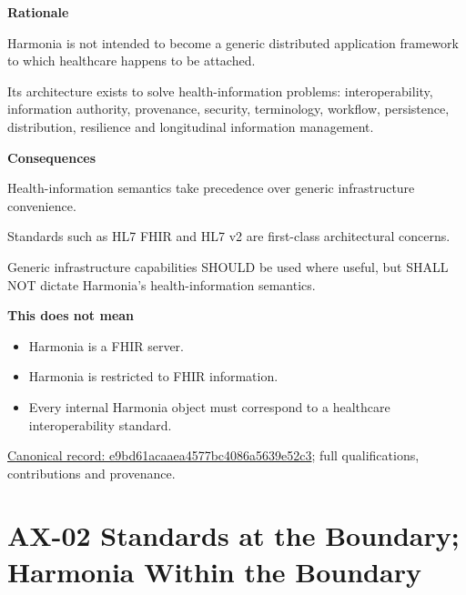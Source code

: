 \par\medskip\textbf{Rationale}\par


Harmonia is not intended to become a generic distributed application
framework to which healthcare happens to be attached.



Its architecture exists to solve health-information problems:
interoperability, information authority, provenance, security,
terminology, workflow, persistence, distribution, resilience and
longitudinal information management.



\par\medskip\textbf{Consequences}\par


Health-information semantics take precedence over generic infrastructure
convenience.



Standards such as HL7 FHIR and HL7 v2 are first-class architectural
concerns.



Generic infrastructure capabilities SHOULD be used where useful, but
SHALL NOT dictate Harmonia's health-information semantics.



\textbf{This does not mean}



\begin{itemize}


\item Harmonia is a FHIR server.

\item Harmonia is restricted to FHIR information.

\item Every internal Harmonia object must correspond to a healthcare interoperability standard.

\end{itemize}

{\footnotesize \href{../../../../continuum/motivation/principle/e9bd61acaaea4577bc4086a5639e52c3.md}{Canonical record: e9bd61acaaea4577bc4086a5639e52c3}; full qualifications, contributions and provenance.}\par
\section{AX-02 Standards at the Boundary; Harmonia Within the Boundary}

